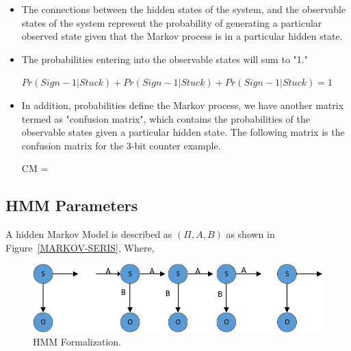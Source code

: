 \begin{itemize}
\item The connections between the hidden states of the system, and the observable states of the system represent the probability of generating a particular observed state given that the Markov process is in a particular hidden state.

\item The probabilities entering into the observable states will sum to "1." 

\begin{center}
$Pr(Sign-1|Stuck) + Pr(Sign-1|Stuck) + Pr(Sign-1|Stuck)  = 1 $
\end{center}

\item In addition, probabilities define the Markov process, we have another matrix termed as "confusion matrix", which contains the probabilities of the observable states given a particular hidden state. The following matrix is the confusion matrix for the 3-bit counter example.


\begin{center}


CM = 
\end{center}
\end{itemize}


\subsection{HMM Parameters}

A hidden Markov Model is described as $(\Pi, A, B)$ as shown in Figure~\ref{MARKOV-SERIS}, Where,


\begin{figure}[tb!]

 \centering
  \captionsetup{justification=centering}    
   \includegraphics[scale=0.8]{Figures/MARKOV-SERIS.pdf}
   \caption{HMM Formalization.}
\label{fig:MARKOV-SERIS}
\end{figure}


